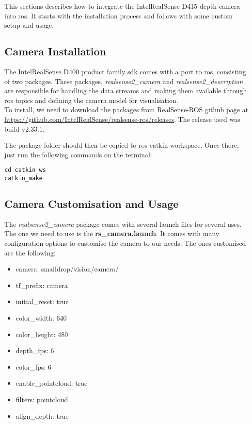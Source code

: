 This sections describes how to integrate the Intel\textregistered RealSense\texttrademark{} D415 depth camera into \gls{ros}. It starts with the installation process and follows with some custom setup and usage.

\subsection{Camera Installation}
\label{subsec:ros_setup_camera_installation}

The Intel\textregistered RealSense\texttrademark{} D400 product family \gls{sdk} comes with a port to \gls{ros}, consisting of two packages. These packages, \textit{realsense2\_camera} and \textit{realsense2\_description} are responsible for handling the data streams and making them available through \gls{ros} topics and defining the camera model for visualisation.\\

To install, we need to download the packages from RealSense-ROS github page at \url{https://github.com/IntelRealSense/realsense-ros/releases}. The release used was build v2.33.1.

The package folder should then be copied to \gls{ros} catkin workspace. Once there, just run the following commands on the terminal:

\begin{verbatim}
cd catkin_ws
catkin_make
\end{verbatim}


\subsection{Camera Customisation and Usage}
\label{subsec:ros_setup_camera_customisation_usage}

The \textit{realsense2\_camera} package comes with several launch files for several uses. The one we need to use is the \textbf{rs\_camera.launch}. It comes with many configuration options to customise the camera to our needs. The ones customised are the following:

\begin{itemize}
    \item camera: smalldrop/vision/camera/
    \item tf\_prefix: camera
    \item initial\_reset: true
    \item color\_width: 640
    \item color\_height: 480
    \item depth\_fps: 6
    \item color\_fps: 6
    \item enable\_pointcloud: true
    \item filters: pointcloud
    \item align\_depth: true
\end{itemize}

